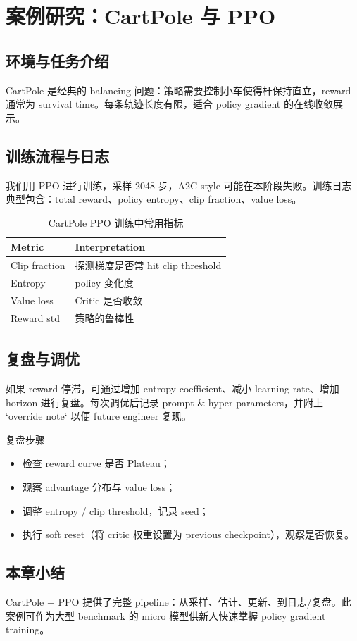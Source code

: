 \section{案例研究：CartPole 与 PPO}
\subsection{环境与任务介绍}
CartPole 是经典的 balancing 问题：策略需要控制小车使得杆保持直立，reward 通常为 survival time。每条轨迹长度有限，适合 policy gradient 的在线收敛展示。

\subsection{训练流程与日志}
我们用 PPO 进行训练，采样 2048 步，A2C style 可能在本阶段失败。训练日志典型包含：total reward、policy entropy、clip fraction、value loss。
\begin{table}[H]
\centering
\small
\begin{tabular}{p{}p{}}
\toprule
Metric & Interpretation \\
\midrule
Clip fraction & 探测梯度是否常 hit clip threshold \\
Entropy & policy 变化度 \\
Value loss & Critic 是否收敛 \\
Reward std & 策略的鲁棒性 \\
\bottomrule
\end{tabular}
\caption{CartPole PPO 训练中常用指标}
\end{table}

\subsection{复盘与调优}
如果 reward 停滞，可通过增加 entropy coefficient、减小 learning rate、增加 horizon 进行复盘。每次调优后记录 prompt \& hyper parameters，并附上 `override note` 以便 future engineer 复现。

\begin{knowledgebox}{复盘步骤}
\begin{itemize}
    \item 检查 reward curve 是否 Plateau；
    \item 观察 advantage 分布与 value loss；
\item 调整 entropy / clip threshold，记录 seed；
\item 执行 soft reset（将 critic 权重设置为 previous checkpoint），观察是否恢复。
\end{itemize}
\end{knowledgebox}

\subsection{本章小结}
CartPole + PPO 提供了完整 pipeline：从采样、估计、更新、到日志/复盘。此案例可作为大型 benchmark 的 micro 模型供新人快速掌握 policy gradient training。

